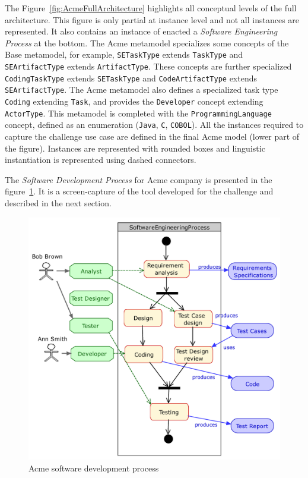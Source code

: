 
The Figure~\ref{fig:AcmeFullArchitecture} highlights all conceptual levels of the full architecture. This figure is only partial at instance level and not all instances are represented. It also contains an instance of enacted a \textit{Software Engineering Process} at the bottom. The Acme metamodel specializes some concepts of the Base metamodel, for example, \texttt{SETaskType} extends \texttt{TaskType} and \texttt{SEArtifactType} extends \texttt{ArtifactType}. These concepts are further specialized  \texttt{CodingTaskType} extends \texttt{SETaskType} and \texttt{CodeArtifactType} extends \texttt{SEArtifactType}. 
The Acme metamodel also defines a specialized task type \texttt{Coding} extending \texttt{Task}, and provides the \texttt{Developer} concept extending \texttt{ActorType}. This metamodel is completed with the \texttt{ProgrammingLanguage} concept, defined as an enumeration (\texttt{Java}, \texttt{C}, \texttt{COBOL}). All the instances required to capture the challenge use case are defined in the final Acme model (lower part of the figure). Instances are represented with rounded boxes and linguistic instantiation is represented using dashed connectors.

The \textit{Software Development Process} for Acme company is presented in the figure~\ref{fig:AcmeSoftwareDevelopmentProcess}. It is a screen-capture of the tool developed for the challenge and described in the next section. 

\begin{figure}[t]
 \centering
    \includegraphics[width=1.0 \columnwidth]{Figures/SoftwareEngineeringProcessCroped.pdf}
     \caption{Acme software development process}
    \label{fig:AcmeSoftwareDevelopmentProcess}
\end{figure}

